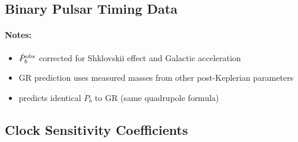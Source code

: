 \subsection{Binary Pulsar Timing Data}\label{app:pulsar_data}

\begin{table}[h!]
\centering
\caption{Binary pulsar systems used for gravitational tests.}
\label{tab:pulsars}
\end{table}

\paragraph{Notes:}
\begin{itemize}
\item $\dot{P}_b^{\rm obs}$ corrected for Shklovskii effect and Galactic acceleration
\item GR prediction uses measured masses from other post-Keplerian parameters
\item \DFD predicts identical $\dot{P}_b$ to GR (same quadrupole formula)
\end{itemize}

\subsection{Clock Sensitivity Coefficients}\label{app:clock_coeffs}

